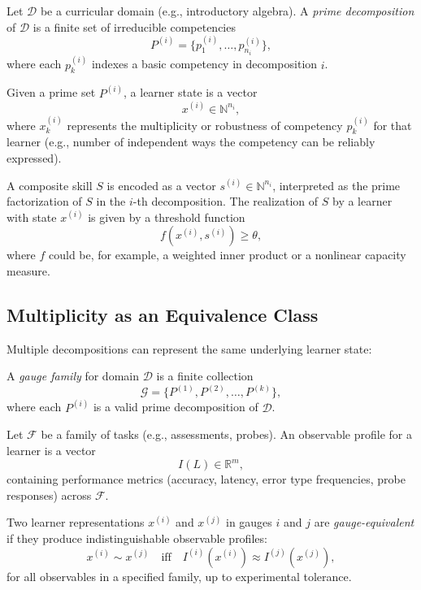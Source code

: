 \documentclass[11pt]{article}
\begin{document}
Let $\mathcal{D}$ be a curricular domain (e.g., introductory algebra). A \emph{prime decomposition} of $\mathcal{D}$ is a finite set of irreducible competencies
\[
P^{(i)} = \{p^{(i)}_1, \dots, p^{(i)}_{n_i}\},
\]
where each $p^{(i)}_k$ indexes a basic competency in decomposition $i$.

\begin{definition}
Given a prime set $P^{(i)}$, a learner state is a vector
\[
x^{(i)} \in \mathbb{N}^{n_i},
\]
where $x^{(i)}_k$ represents the multiplicity or robustness of competency $p^{(i)}_k$ for that learner (e.g., number of independent ways the competency can be reliably expressed).
\end{definition}

\begin{definition}
A composite skill $S$ is encoded as a vector $s^{(i)} \in \mathbb{N}^{n_i}$, interpreted as the prime factorization of $S$ in the $i$-th decomposition. The realization of $S$ by a learner with state $x^{(i)}$ is given by a threshold function
\[
f\left(x^{(i)}, s^{(i)}\right) \geq \theta,
\]
where $f$ could be, for example, a weighted inner product or a nonlinear capacity measure.
\end{definition}

\subsection{Multiplicity as an Equivalence Class}

Multiple decompositions can represent the same underlying learner state:

\begin{definition}
A \emph{gauge family} for domain $\mathcal{D}$ is a finite collection
\[
\mathcal{G} = \{ P^{(1)}, P^{(2)}, \dots, P^{(k)} \},
\]
where each $P^{(i)}$ is a valid prime decomposition of $\mathcal{D}$.
\end{definition}

\begin{definition}
Let $\mathcal{F}$ be a family of tasks (e.g., assessments, probes). An observable profile for a learner is a vector
\[
I(L) \in \mathbb{R}^m,
\]
containing performance metrics (accuracy, latency, error type frequencies, probe responses) across $\mathcal{F}$.
\end{definition}

\begin{definition}
Two learner representations $x^{(i)}$ and $x^{(j)}$ in gauges $i$ and $j$ are \emph{gauge-equivalent} if they produce indistinguishable observable profiles:
\[
x^{(i)} \sim x^{(j)} \quad \text{iff} \quad I^{(i)}(x^{(i)}) \approx I^{(j)}(x^{(j)}),
\]
for all observables in a specified family, up to experimental tolerance.
\end{definition}
\end{document}
